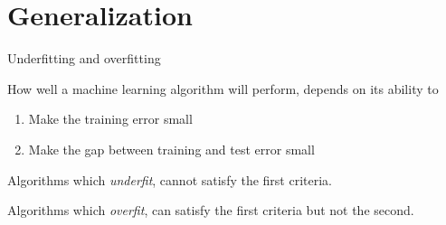 \documentclass[dvipsnames]{beamer}
\begin{document}
	\section{Generalization}
	\begin{frame}{Underfitting and overfitting}

How well a machine learning algorithm will perform, depends on its ability to \pause
\begin{enumerate}
\item Make the training error small \pause
\item Make the gap between training and test error small \pause
\end{enumerate}

Algorithms which \emph{underfit}, cannot satisfy the first criteria. \pause

Algorithms which \emph{overfit}, can satisfy the first criteria but not the second.
\end{frame}
\end{document}

